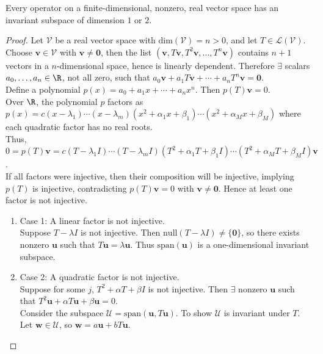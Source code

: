 \begin{theorem} \label{thm:invariantsubspaceexistence} Every operator on a finite-dimensional, nonzero, real vector space has an invariant subspace of dimension $1$ or $2$.
\begin{proof} Let $\mathcal{V}$ be a real vector space with $\text{dim}(\mathcal{V}) = n > 0$, and let $T \in \mathcal{L}(\mathcal{V})$. Choose $\mathbf{v} \in \mathcal{V}$ with $\mathbf{v} \neq \mathbf{0}$, then the list $(\mathbf{v}, T\mathbf{v}, T^2 \mathbf{v}, \ldots, T^n \mathbf{v})$ contains $n+1$ vectors in a $n$-dimensional space, hence is linearly dependent. Therefore $\exists$ scalars $a_0, \ldots, a_n \in \R$, not all zero, such that $a_0 \mathbf{v} + a_1 T \mathbf{v} + \cdots + a_n T^n \mathbf{v} = \mathbf{0}$.\\
Define a polynomial $p(x) = a_0 + a_1 x + \cdots + a_n x^n$. Then $p(T)\mathbf{v} = 0$.\\
Over $\R$, the polynomial $p$ factors as $p(x) = c(x-\lambda_1) \cdots (x-\lambda_m) (x^2 + \alpha_1 x + \beta_1)\cdots(x^2 + \alpha_M x + \beta_M)$ where each quadratic factor has no real roots.\\
Thus, $0 = p(T)\mathbf{v} = c(T - \lambda_1 I) \cdots (T - \lambda_m I)(T^2 + \alpha_1 T + \beta_1 I)\cdots (T^2 + \alpha_M T + \beta_M I)\mathbf{v}$.\\
If all factors were injective, then their composition will be injective, implying $p(T)$ is injective, contradicting $p(T) \mathbf{v} = 0$ with $\mathbf{v} \neq \mathbf{0}$. Hence at least one factor is not injective.
\begin{enumerate}[label=\roman*.]
\setlength{\itemsep}{0pt}
\item Case 1: A linear factor is not injective.\\
Suppose $T - \lambda I$ is not injective. Then $\text{null}(T - \lambda I) \neq \{ \mathbf{0} \}$, so there exists nonzero $\mathbf{u}$ such that $T\mathbf{u} = \lambda \mathbf{u}$. Thus $\text{span}(\mathbf{u})$ is a one-dimensional invariant subspace.
\item Case 2: A quadratic factor is not injective.\\
Suppose for some $j$, $T^2 + \alpha T + \beta I$ is not injective. Then $\exists$ nonzero $\mathbf{u}$ such that $T^2 \mathbf{u} + \alpha T \mathbf{u} + \beta \mathbf{u} = 0$.\\
Consider the subspace $\mathcal{U} = \text{span}(\mathbf{u}, T \mathbf{u})$. To show $\mathcal{U}$ is invariant under $T$. Let $\mathbf{w} \in \mathcal{U}$, so $\mathbf{w} = a \mathbf{u} + b T \mathbf{u}$.\\

\end{enumerate}
\end{proof}
\end{theorem}
